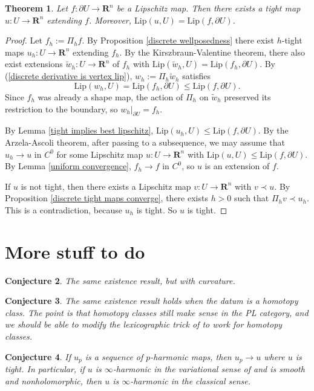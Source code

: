 \documentclass[reqno,11pt]{amsart}
\newcommand{\RR}{\mathbf{R}}
\newcommand{\Lip}{\mathrm{Lip}}
\newtheorem{theorem}{Theorem}[section]
\newtheorem{conjecture}[theorem]{Conjecture}
\theoremstyle{definition}
\numberwithin{equation}{section}
\begin{document}
\begin{theorem}
Let $f: \partial U \to \RR^n$ be a Lipschitz map.
Then there exists a tight map $u: U \to \RR^n$ extending $f$.
Moreover, $\Lip(u, U) = \Lip(f, \partial U)$.
\end{theorem}
\begin{proof}
Let $f_h := \Pi_h f$.
By Proposition \ref{discrete wellposedness} there exist $h$-tight maps $u_h: U \to \RR^n$ extending $f_h$.
By the Kirszbraun-Valentine theorem, there also exist extensions $\tilde w_h: U \to \RR^n$ of $f_h$ with $\Lip(\tilde w_h, U) = \Lip(f_h, \partial U)$.
By (\ref{discrete derivative is vertex lip}), $w_h := \Pi_h \tilde w_h$ satisfies
$$\Lip(w_h, U) = \Lip(f_h, \partial U) \leq \Lip(f, \partial U).$$
Since $f_h$ was already a shape map, the action of $\Pi_h$ on $\tilde w_h$ preserved its restriction to the boundary, so $w_h|_{\partial U} = f_h$.

By Lemma \ref{tight implies best lipschitz}, $\Lip(u_h, U) \leq \Lip(f, \partial U)$.
By the Arzela-Ascoli theorem, after passing to a subsequence, we may assume that $u_h \to u$ in $C^0$ for some Lipschitz map $u: U \to \RR^n$ with $\Lip(u, U) \leq \Lip(f, \partial U)$.
By Lemma \ref{uniform convergence}, $f_h \to f$ in $C^0$, so $u$ is an extension of $f$.

If $u$ is not tight, then there exists a Lipschitz map $v: U \to \RR^n$ with $v \prec u$.
By Proposition \ref{discrete tight maps converge}, there exists $h > 0$ such that $\Pi_h v \prec u_h$.
This is a contradiction, because $u_h$ is tight.
So $u$ is tight.
\end{proof}

\section{More stuff to do}
\begin{conjecture}
The same existence result, but with curvature.
\end{conjecture}

\begin{conjecture}
The same existence result holds when the datum is a homotopy class.
The point is that homotopy classes still make sense in the PL category, and we should be able to modify the lexicographic trick of \cite[Theorem 1.2]{Sheffield12} to work for homotopy classes.
\end{conjecture}

\begin{conjecture}
If $u_p$ is a sequence of $p$-harmonic maps, then $u_p \to u$ where $u$ is tight.
In particular, if $u$ is $\infty$-harmonic in the variational sense of \cite{daskalopoulos2022} and is smooth and nonholomorphic, then $u$ is $\infty$-harmonic in the classical sense.
\end{conjecture}
\end{document}
